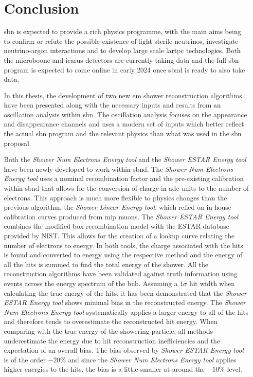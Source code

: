 \chapter{Conclusion}
\label{chap:Conclusion}

\gls{sbn} is expected to provide a rich physics programme, with the main aims being to confirm or refute the possible existence of light sterile neutrinos, investigate neutrino-argon interactions and to develop large scale \gls{lartpc} technologies. Both the \gls{microboone} and \gls{icarus} detectors are currently taking data and the full \gls{sbn} program is expected to come online in early 2024 once \gls{sbnd} is ready to also take data. 

In this thesis, the development of two new \gls{em} shower reconstruction algorithms have been presented along with the necessary inputs and results from an oscillation analysis within \gls{sbn}. The oscillation analysis focuses on the \nue appearance and disappearance channels and uses a modern set of inputs which better reflect the actual \gls{sbn} program and the relevant physics than what was used in the \gls{sbn} proposal.

Both the \textit{Shower Num Electrons Energy tool} and the \textit{Shower ESTAR Energy tool} have been newly developed to work within \gls{sbnd}. The \textit{Shower Num Electrons Energy tool} uses a nominal recombination factor and the pre-existing calibration within \gls{sbnd} that allows for the conversion of charge in \gls{adc} units to the number of electrons. This approach is much more flexible to physics changes than the previous algorithm, the \textit{Shower Linear Energy tool}, which relied on in-house calibration curves produced from \gls{mip} muons. The \textit{Shower ESTAR Energy tool} combines the modified box recombination model with the ESTAR database provided by NIST. This allows for the creation of a lookup curve relating the number of electrons to energy. In both tools, the charge associated with the hits is found and converted to energy using the respective method and the energy of all the hits is summed to find the total energy of the shower. All the reconstruction algorithms have been validated against truth information using events across the energy spectrum of the \gls{bnb}. Assuming a $1\sigma$ hit width when calculating the true energy of the hits, it has been demonstrated that the \textit{Shower ESTAR Energy tool} shows minimal bias in the reconstructed energy. The \textit{Shower Num Electrons Energy tool} systematically applies a larger energy to all of the hits and therefore tends to overestimate the reconstructed hit energy. When comparing with the true energy of the showering particle, all methods underestimate the energy due to hit reconstruction inefficiencies and the expectation of an overall bias. The bias observed by \textit{Shower ESTAR Energy tool} is of the order $-20\%$ and since the \textit{Shower Num Electrons Energy tool} applies higher energies to the hits, the bias is a little smaller at around the $-10\%$ level.

